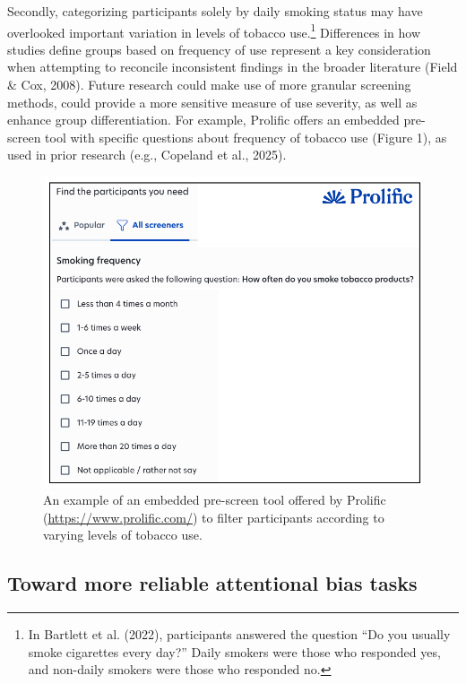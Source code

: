 \documentclass[authordate, empirical]{jote-new-article}
\begin{document}
	Secondly, categorizing participants solely by daily smoking status may have overlooked important variation in levels of tobacco use.\footnote{ In Bartlett et al. (2022), participants answered the question “Do you usually smoke cigarettes every day?” Daily smokers were those who responded yes, and non-daily smokers were those who responded no.} Differences in how studies define groups based on frequency of use represent a key consideration when attempting to reconcile inconsistent findings in the broader literature (Field \& Cox, 2008). Future research could make use of more granular screening methods, could provide a more sensitive measure of use severity, as well as enhance group differentiation. For example, Prolific offers an embedded pre-screen tool with specific questions about frequency of tobacco use (Figure 1), as used in prior research (e.g., Copeland et al., 2025).



	\begin{figure}
		\includegraphics[width=\linewidth]{media/image1.png}

		\caption{An example of an embedded pre-screen tool offered by Prolific (\url{https://www.prolific.com/}) to filter participants according to varying levels of tobacco use.}

		\label{fig:rId11}


	\end{figure}





	\subsection{Toward more reliable attentional bias tasks}
\end{document}
